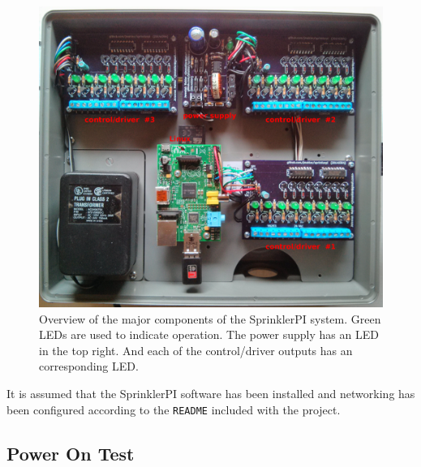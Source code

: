 \documentclass{article}
\begin{document}
\begin{figure}[h!]
\begin{center}
\includegraphics[scale=0.7]{img/all-inst-03.png}
\end{center}
\caption{Overview of the major components of the SprinklerPI system.
Green LEDs are used to indicate operation.
The power supply has an LED in the top right.
And each of the control/driver outputs has an corresponding LED.}
\label{fig:all}
\end{figure}

It is assumed that the SprinklerPI software has been installed
and networking has been configured according to the \verb+README+
included with the project\autocite{sprinklerpi}.

\pagebreak

\subsection{Power On Test}
\end{document}
